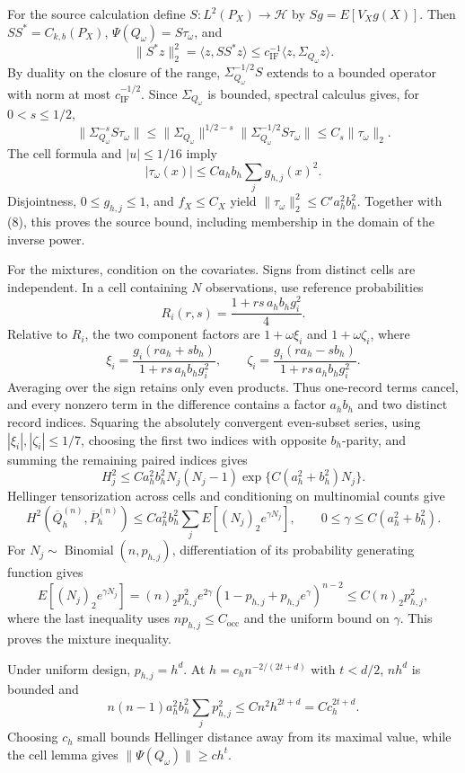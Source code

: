 For the source calculation define \(S:L^2(P_X)\to\mathcal H\) by \(Sg=E[V_Xg(X)]\). Then \(SS^*=C_{k,b}(P_X)\), \(\Psi(Q_\omega)=S\tau_\omega\), and
\[
\|S^*z\|_2^2=\langle z,SS^*z\rangle
\le c_{\mathrm{IF}}^{-1}\langle z,\Sigma_{Q_\omega}z\rangle.
\]
By duality on the closure of the range, \(\Sigma_{Q_\omega}^{-1/2}S\) extends to a bounded operator with norm at most \(c_{\mathrm{IF}}^{-1/2}\). Since \(\Sigma_{Q_\omega}\) is bounded, spectral calculus gives, for \(0<s\le1/2\),
\[
\|\Sigma_{Q_\omega}^{-s}S\tau_\omega\|
\le\|\Sigma_{Q_\omega}\|^{1/2-s}
 \|\Sigma_{Q_\omega}^{-1/2}S\tau_\omega\|
\le C_s\|\tau_\omega\|_2. \tag{8}
\]
The cell formula and \(|u|\le1/16\) imply
\[
|\tau_\omega(x)|\le Ca_hb_h\sum_jg_{h,j}(x)^2.
\]
Disjointness, \(0\le g_{h,j}\le1\), and \(f_X\le C_X\) yield \(\|\tau_\omega\|_2^2\le C'a_h^2b_h^2\). Together with (8), this proves the source bound, including membership in the domain of the inverse power.

For the mixtures, condition on the covariates. Signs from distinct cells are independent. In a cell containing \(N\) observations, use reference probabilities
\[
R_i(r,s)=\frac{1+rs\,a_hb_hg_i^2}{4}.
\]
Relative to \(R_i\), the two component factors are \(1+\omega\xi_i\) and \(1+\omega\zeta_i\), where
\[
\xi_i=\frac{g_i(ra_h+sb_h)}{1+rs\,a_hb_hg_i^2},\qquad
\zeta_i=\frac{g_i(ra_h-sb_h)}{1+rs\,a_hb_hg_i^2}.
\]
Averaging over the sign retains only even products. Thus one-record terms cancel, and every nonzero term in the difference contains a factor \(a_hb_h\) and two distinct record indices. Squaring the absolutely convergent even-subset series, using \(|\xi_i|,|\zeta_i|\le1/7\), choosing the first two indices with opposite \(b_h\)-parity, and summing the remaining paired indices gives
\[
H_j^2\le Ca_h^2b_h^2N_j(N_j-1)
\exp\{C(a_h^2+b_h^2)N_j\}. \tag{9}
\]
Hellinger tensorization across cells and conditioning on multinomial counts give
\[
H^2(\overline Q_h^{(n)},\overline P_h^{(n)})
\le Ca_h^2b_h^2\sum_jE[(N_j)_2e^{\gamma N_j}],
\qquad 0\le\gamma\le C(a_h^2+b_h^2).
\]
For \(N_j\sim\operatorname{Binomial}(n,p_{h,j})\), differentiation of its probability generating function gives
\[
E[(N_j)_2e^{\gamma N_j}]
=(n)_2p_{h,j}^2e^{2\gamma}
(1-p_{h,j}+p_{h,j}e^\gamma)^{n-2}
\le C(n)_2p_{h,j}^2,
\]
where the last inequality uses \(np_{h,j}\le C_{\mathrm{occ}}\) and the uniform bound on \(\gamma\). This proves the mixture inequality.

Under uniform design, \(p_{h,j}=h^d\). At \(h=c_hn^{-2/(2t+d)}\) with \(t<d/2\), \(nh^d\) is bounded and
\[
n(n-1)a_h^2b_h^2\sum_jp_{h,j}^2
\le Cn^2h^{2t+d}=Cc_h^{2t+d}.
\]
Choosing \(c_h\) small bounds Hellinger distance away from its maximal value, while the cell lemma gives \(\|\Psi(Q_\omega)\|\ge ch^t\).

